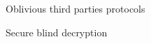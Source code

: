 \begin{frame}{Oblivious third parties protocols}

\end{frame}

\begin{frame}{Secure blind decryption}

\end{frame}

% 
%  
%        
%        
% 
%        
%        
% 
%  
%  
% 
% 
% 
% 
% 
% 
